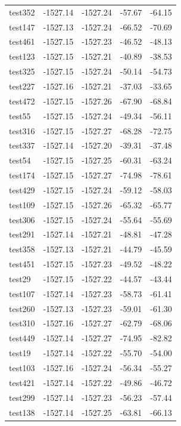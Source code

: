 \documentclass[journal=jacsat,manuscript=article]{achemso}
\begin{document}
\begin{table}[b!]
\begin{tabular}{lrrrr}
test352 &  -1527.14 &  -1527.24 &  -57.67 &  -64.15 \\
test147 &  -1527.13 &  -1527.24 &  -66.52 &  -70.69 \\
test461 &  -1527.15 &  -1527.23 &  -46.52 &  -48.13 \\
test123 &  -1527.15 &  -1527.21 &  -40.89 &  -38.53 \\
test325 &  -1527.15 &  -1527.24 &  -50.14 &  -54.73 \\
test227 &  -1527.16 &  -1527.21 &  -37.03 &  -33.65 \\
test472 &  -1527.15 &  -1527.26 &  -67.90 &  -68.84 \\
test55  &  -1527.15 &  -1527.24 &  -49.34 &  -56.11 \\
test316 &  -1527.15 &  -1527.27 &  -68.28 &  -72.75 \\
test337 &  -1527.14 &  -1527.20 &  -39.31 &  -37.48 \\
test54  &  -1527.15 &  -1527.25 &  -60.31 &  -63.24 \\
test174 &  -1527.15 &  -1527.27 &  -74.98 &  -78.61 \\
test429 &  -1527.15 &  -1527.24 &  -59.12 &  -58.03 \\
test109 &  -1527.15 &  -1527.26 &  -65.32 &  -65.77 \\
test306 &  -1527.15 &  -1527.24 &  -55.64 &  -55.69 \\
test291 &  -1527.14 &  -1527.21 &  -48.81 &  -47.28 \\
test358 &  -1527.13 &  -1527.21 &  -44.79 &  -45.59 \\
test451 &  -1527.15 &  -1527.23 &  -49.52 &  -48.22 \\
test29  &  -1527.15 &  -1527.22 &  -44.57 &  -43.44 \\
test107 &  -1527.14 &  -1527.23 &  -58.73 &  -61.41 \\
test260 &  -1527.13 &  -1527.23 &  -59.01 &  -61.30 \\
test310 &  -1527.16 &  -1527.27 &  -62.79 &  -68.06 \\
test449 &  -1527.14 &  -1527.27 &  -74.95 &  -82.82 \\
test19  &  -1527.14 &  -1527.22 &  -55.70 &  -54.00 \\
test103 &  -1527.16 &  -1527.24 &  -56.34 &  -55.27 \\
test421 &  -1527.14 &  -1527.22 &  -49.86 &  -46.72 \\
test299 &  -1527.14 &  -1527.23 &  -56.23 &  -57.44 \\
test138 &  -1527.14 &  -1527.25 &  -63.81 &  -66.13 \\

\end{tabular}
\end{table}
\end{document}
